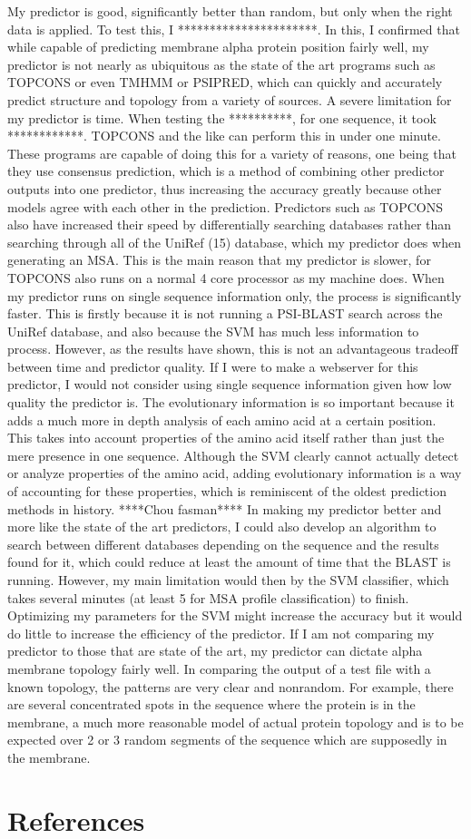 \documentclass[final]{article}
\begin{document}
My predictor is good, significantly better than random, but only when the right data is applied. To test this, I **********************. In this, I confirmed that while capable of predicting membrane alpha protein position fairly well, my predictor is not nearly as ubiquitous as the state of the art programs such as TOPCONS or even TMHMM or PSIPRED, which can quickly and accurately predict structure and topology from a variety of sources. 
A severe limitation for my predictor is time. When testing the **********, for one sequence, it took ************. TOPCONS and the like can perform this in under one minute. These programs are capable of doing this for a variety of reasons, one being that they use consensus prediction, which is a method of combining other predictor outputs into one predictor, thus increasing the accuracy greatly because other models agree with each other in the prediction. Predictors such as TOPCONS also have increased their speed by differentially searching databases rather than searching through all of the UniRef (15) database, which my predictor does when generating an MSA. This is the main reason that my predictor is slower, for TOPCONS also runs on a normal 4 core processor as my machine does. 
When my predictor runs on single sequence information only, the process is significantly faster. This is firstly because it is not running a PSI-BLAST search across the UniRef database, and also because the SVM has much less information to process. However, as the results have shown, this is not an advantageous tradeoff between time and predictor quality. If I were to make a webserver for this predictor, I would not consider using single sequence information given how low quality the predictor is. The evolutionary information is so important because it adds a much more in depth analysis of each amino acid at a certain position. This takes into account properties of the amino acid itself rather than just the mere presence in one sequence. Although the SVM clearly cannot actually detect or analyze properties of the amino acid, adding evolutionary information is a way of accounting for these properties, which is reminiscent of the oldest prediction methods in history. ****Chou fasman**** 
In making my predictor better and more like the state of the art predictors, I could also develop an algorithm to search between different databases depending on the sequence and the results found for it, which could reduce at least the amount of time that the BLAST is running. However, my main limitation would then by the SVM classifier, which takes several minutes (at least 5 for MSA profile classification) to finish. Optimizing my parameters for the SVM might increase the accuracy but it would do little to increase the efficiency of the predictor. 
If I am not comparing my predictor to those that are state of the art, my predictor can dictate alpha membrane topology fairly well. In comparing the output of a test file with a known topology, the patterns are very clear and nonrandom. For example, there are several concentrated spots in the sequence where the protein is in the membrane, a much more reasonable model of actual protein topology and is to be expected over 2 or 3 random segments of the sequence which are supposedly in the membrane.  


\section{References}
\end{document}
